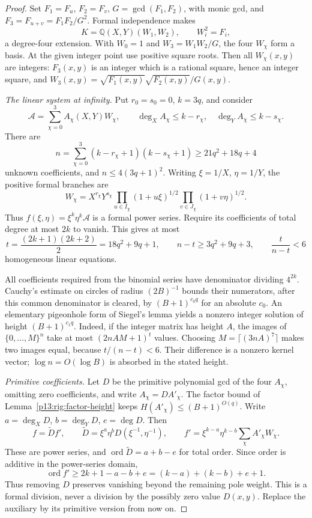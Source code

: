 \begin{proof}
Set $F_1=F_u$, $F_2=F_v$, $G=\gcd(F_1,F_2)$, with monic
gcd, and $F_3=F_{u+v}=F_1F_2/G^2$.
Formal independence makes
\[
 K=\mathbb Q(X,Y)(W_1,W_2),\qquad W_i^2=F_i,
\]
a degree-four extension.  With $W_0=1$ and
$W_3=W_1W_2/G$, the four $W_\chi$ form a basis.  At the
given integer point use positive square roots.  Then all
$W_\chi(x,y)$ are integers: $F_3(x,y)$ is an integer which
is a rational square, hence an integer square, and
$W_3(x,y)=\sqrt{F_1(x,y)}\sqrt{F_2(x,y)}/G(x,y)$.

\emph{The linear system at infinity.}
Put $r_0=s_0=0$, $k=3q$, and consider
\[
 \mathcal A=\sum_{\chi=0}^3A_\chi(X,Y)W_\chi,
 \qquad \deg_XA_\chi\le k-r_\chi,
 \quad \deg_YA_\chi\le k-s_\chi.
\]
There are
\[
 n=\sum_{\chi=0}^3(k-r_\chi+1)(k-s_\chi+1)
   \ge21q^2+18q+4
\]
unknown coefficients, and $n\le4(3q+1)^2$.
Writing $\xi=1/X$, $\eta=1/Y$, the positive formal branches
are
\[
 W_\chi=X^{r_\chi}Y^{s_\chi}
 \prod_{u\in I_\chi}(1+u\xi)^{1/2}
 \prod_{v\in J_\chi}(1+v\eta)^{1/2}.
\]
Thus $f(\xi,\eta)=\xi^k\eta^k\mathcal A$ is a formal
power series.  Require its coefficients of total degree at
most $2k$ to vanish.  This gives at most
\[
 t=\frac{(2k+1)(2k+2)}2=18q^2+9q+1,
 \qquad n-t\ge3q^2+9q+3,\qquad \frac t{n-t}<6
\]
homogeneous linear equations.

All coefficients required from the binomial series have
denominator dividing $4^{2k}$.  Cauchy's estimate on circles
of radius $(2B)^{-1}$ bounds their numerators, after this
common denominator is cleared, by $(B+1)^{c_0q}$ for an
absolute $c_0$.  An elementary pigeonhole form of Siegel's
lemma yields a nonzero integer solution of height
$(B+1)^{c_1q}$.  Indeed, if the integer matrix has height $A$,
the images of $\{0,\ldots,M\}^n$ take at most
$(2nAM+1)^t$ values.  Choosing
$M=\lceil(3nA)^7\rceil$ makes two images equal, because
$t/(n-t)<6$.  Their difference is a nonzero kernel vector;
$\log n=O(\log B)$ is absorbed in the stated height.

\emph{Primitive coefficients.}
Let $D$ be the primitive polynomial gcd of the four
$A_\chi$, omitting zero coefficients, and write
$A_\chi=DA'_\chi$.  The factor bound
of Lemma~\ref{p13:rig:factor-height} keeps
$H(A'_\chi)\le(B+1)^{O(q)}$.  Write
$a=\deg_XD$, $b=\deg_YD$, $e=\deg D$.  Then
\[
 f=\widetilde D f',\qquad
 \widetilde D=\xi^a\eta^bD(\xi^{-1},\eta^{-1}),\qquad
 f'=\xi^{k-a}\eta^{k-b}\sum_\chi A'_\chi W_\chi.
\]
These are power series, and
$\operatorname{ord}\widetilde D=a+b-e$ for total order.
Since order is additive in the power-series domain,
\begin{equation}
 \operatorname{ord}f'\ge2k+1-a-b+e
                          =(k-a)+(k-b)+e+1.
 \label{p13:rig:primitive-order}
\end{equation}
Thus removing $D$ preserves vanishing beyond the remaining
pole weight.  This is a formal division, never a division
by the possibly zero value $D(x,y)$.  Replace the auxiliary
by its primitive version from now on.


\end{proof}
